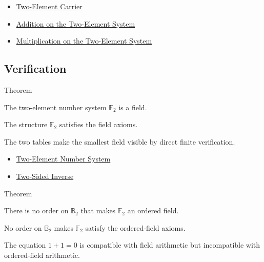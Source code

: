 \begin{dependencies}
\begin{itemize}
  \item \hyperref[def:two-element-carrier]{Two-Element Carrier}
  \item \hyperref[def:addition-on-two-element-system]{Addition on the Two-Element System}
  \item \hyperref[def:multiplication-on-two-element-system]{Multiplication on the Two-Element System}
\end{itemize}
\end{dependencies}

\subsection*{Verification}

\begin{theorembox}{Theorem}
\begin{theorem}
\label{thm:two-element-system-is-field}
The two-element number system \(\mathbb{F}_2\) is a field.
\end{theorem}

\begin{remark*}
The structure \(\mathbb{F}_2\) satisfies the field axioms.
\end{remark*}

\begin{remark*}[Interpretation]
The two tables make the smallest field visible by direct finite verification.
\end{remark*}
\end{theorembox}


\begin{dependencies}
\begin{itemize}
  \item \hyperref[def:two-element-number-system]{Two-Element Number System}
  \item \hyperref[def:two-sided-inverse]{Two-Sided Inverse}
\end{itemize}
\end{dependencies}

\begin{theorembox}{Theorem}
\begin{theorem}
\label{thm:two-element-system-not-ordered-field}
There is no order on \(\mathbb{B}_2\) that makes
\(\mathbb{F}_2\) an ordered field.
\end{theorem}

\begin{remark*}
No order on \(\mathbb{B}_2\) makes \(\mathbb{F}_2\) satisfy the ordered-field axioms.
\end{remark*}

\begin{remark*}[Interpretation]
The equation \(1+1=0\) is compatible with field arithmetic but incompatible with ordered-field arithmetic.
\end{remark*}
\end{theorembox}


